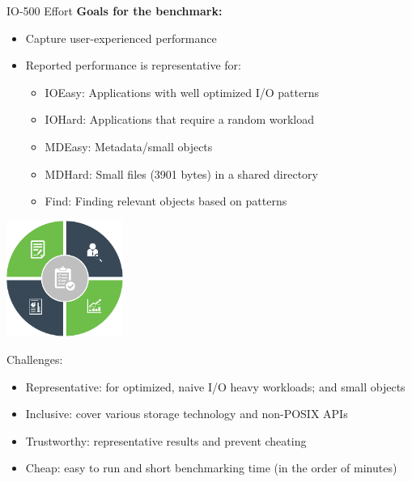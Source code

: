 \documentclass[portrait,a0paper,fontscale=0.4]{baposter}
\begin{document}
\begin{poster}
\begin{posterbox}[name=io500,column=1,span=2]{IO-500 Effort}
\textbf{Goals for the benchmark:}

\begin{minipage}{10.5cm}
\begin{itemize}
\item Capture user-experienced performance %
\item Reported performance is representative for:
\vspace*{-0.5em}
\begin{itemize}
\item IOEasy: Applications with well optimized I/O patterns
\item IOHard: Applications that require a random workload
\item MDEasy: Metadata/small objects
\item MDHard: Small files (3901 bytes) in a shared directory
\item Find: Finding relevant objects based on patterns
\end{itemize}
\end{itemize}
\end{minipage}
\qquad
\begin{minipage}{4cm}
\includegraphics[width=3.8cm]{border}
\end{minipage}


Challenges:
\vspace*{-1em}
\begin{itemize}
\item Representative: for optimized, naive I/O heavy workloads; and small objects
\item Inclusive: cover various storage technology and non-POSIX APIs
\item Trustworthy: representative results and prevent cheating
\item Cheap: easy to run and short benchmarking time (in the order of minutes)
\end{itemize}

\vspace*{-1em}


\end{posterbox}
\end{poster}
\end{document}

